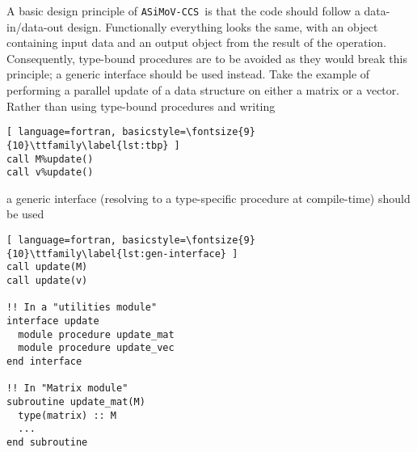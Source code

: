 \documentclass[11pt]{report}
\newcommand{\accs}{\texttt{ASiMoV-CCS}}
\begin{document}
A basic design principle of \accs\ is that the code should follow a data-in/data-out design. Functionally everything looks the same, with an object containing input data and an output object from the result of the operation. Consequently, type-bound procedures are to be avoided as they would break this principle; a generic interface should be used instead. Take the example of performing a parallel update of a data structure on either a matrix or a
vector. Rather than using type-bound procedures and writing
\begin{lstlisting}[ language=fortran, basicstyle=\fontsize{9}{10}\ttfamily\label{lst:tbp} ]
call M%update()
call v%update()
\end{lstlisting}
a generic interface (resolving to a type-specific procedure at compile-time) should be used
\begin{lstlisting}[ language=fortran, basicstyle=\fontsize{9}{10}\ttfamily\label{lst:gen-interface} ]
call update(M)
call update(v)

!! In a "utilities module"
interface update
  module procedure update_mat
  module procedure update_vec
end interface

!! In "Matrix module"
subroutine update_mat(M)
  type(matrix) :: M
  ...
end subroutine
\end{lstlisting}
\end{document}
